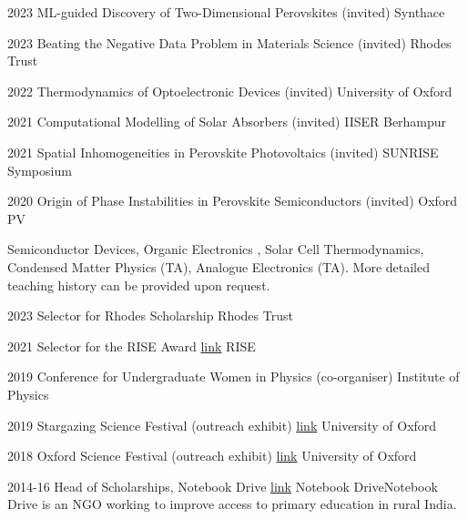 \documentclass{scrartcl}
\begin{document}

\begin{entrylist}

\splitentry
{2023}
{ML-guided Discovery of Two-Dimensional Perovskites (invited)}
{Synthace}{}

\splitentry
{2023}
{Beating the Negative Data Problem in Materials Science (invited)}
{Rhodes Trust}{}

\splitentry
{2022}
{Thermodynamics of Optoelectronic Devices (invited)}
{University of Oxford}{}

\splitentry
{2021}
{Computational Modelling of Solar Absorbers (invited)}
{IISER Berhampur}{}

\splitentry
{2021}
{Spatial Inhomogeneities in Perovskite Photovoltaics (invited)}
{SUNRISE Symposium}{}

\splitentry
{2020}
{Origin of Phase Instabilities in Perovskite Semiconductors (invited)}
{Oxford PV}{}




\end{entrylist}



Semiconductor Devices, Organic Electronics , Solar Cell Thermodynamics, Condensed Matter Physics (TA), Analogue Electronics (TA). More detailed teaching history can be provided upon request.\bigskip


\begin{entrylist}

\splitentry
{2023}
{Selector for Rhodes Scholarship}
{Rhodes Trust}{}

\splitentry
{2021}
{Selector for the RISE Award \href{https://www.risefortheworld.org/}{link}}
{RISE}{}

\splitentry
{2019}
{Conference for Undergraduate Women in Physics (co-organiser)}
{Institute of Physics}{}

\splitentry
{2019}
{Stargazing Science Festival (outreach exhibit) \href{https://web.archive.org/web/20230402133900/https://www.physics.ox.ac.uk/news/stargazing-oxfordhome}{link}}
{University of Oxford}{}

\splitentry
{2018}
{Oxford Science Festival (outreach exhibit) \href{https://web.archive.org/web/20230208050049/https://scienceoxford.com/events/oxfordshire-science-festival/}{link}}
{University of Oxford}{}

\splitentry
{2014-16}
{Head of Scholarships, Notebook Drive \href{https://web.archive.org/web/20230126231829/https://iisc.ac.in/outreach/activities/notebook-drive/}{link}}
{Notebook Drive}{Notebook Drive is an NGO working to improve access to primary education in rural India.}

\end{entrylist}



\vfill
\end{document}
